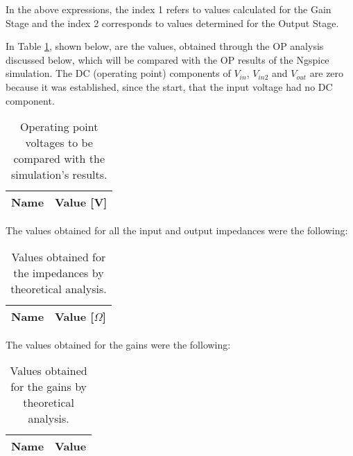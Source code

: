 In the above expressions, the index 1 refers to values calculated for the Gain Stage and the index 2 corresponds to values determined for the Output Stage.
\par
In Table \ref{tab:theoretical_op}, shown below, are the values, obtained through the OP analysis discussed below, which will be compared with the OP results of the Ngspice simulation. The DC (operating point) components of $V_{in}$, $V_{in2}$ and $V_{out}$ are zero because it was established, since the start, that the input voltage had no DC component. 

\begin{table}[H]
  \centering
  \begin{tabular}{|c|c|}
    \hline    
    {\bf Name} & {\bf Value [V]} \\ \hline
    
  \end{tabular}
  \caption{Operating point voltages to be compared with the simulation's results.}
  \label{tab:theoretical_op}
\end{table}

The values obtained for all the input and output impedances were the following:

\begin{table}[H]
  \centering
  \begin{tabular}{|c|c|}
    \hline    
    {\bf Name} & {\bf Value [$\Omega$]} \\ \hline
    
  \end{tabular}
  \caption{Values obtained for the impedances by theoretical analysis.}
  \label{tab:theoretical_impedances}
\end{table}

The values obtained for the gains were the following:

\begin{table}[H]
  \centering
  \begin{tabular}{|c|c|}
    \hline    
    {\bf Name} & {\bf Value} \\ \hline
    
  \end{tabular}
  \caption{Values obtained for the gains by theoretical analysis.}
  \label{tab:theoretical_gains}
\end{table}

